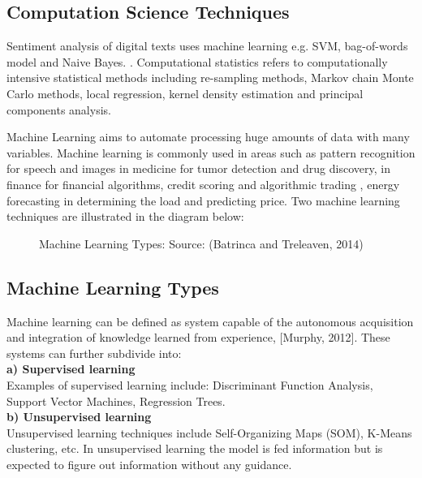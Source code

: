 \subsection{Computation Science Techniques}
Sentiment analysis of digital texts uses machine learning e.g.  SVM, bag-of-words model and Naive Bayes.
\cite{ref26}. Computational statistics refers to computationally intensive statistical methods
including re-sampling methods, Markov chain Monte Carlo methods, local regression, kernel
density estimation and principal components analysis. 

Machine Learning aims to automate processing huge amounts of data with many variables. Machine learning is commonly used in areas such as pattern recognition for speech and  images
in medicine for tumor detection and drug discovery, in finance for financial algorithms, credit scoring and algorithmic trading \cite{ref27}, energy forecasting in determining the load and predicting price.
Two machine learning techniques are illustrated in the diagram below:


\begin{figure}[h]
  \centering
  \caption[Machine learning types]%
  {Machine Learning Types: Source: (Batrinca and Treleaven, 2014)}
  \label{fig:ALAP:sm3}
\end{figure}


\clearpage
\subsection{Machine Learning Types}

Machine learning can be defined as system capable of the autonomous acquisition and integration of knowledge learned from experience, [Murphy, 2012].
These systems can further subdivide into:
\leavevmode\\
\textbf{a) Supervised learning}\\
Examples of supervised learning include: Discriminant Function Analysis, Support Vector Machines, Regression Trees.\\
\textbf{b) Unsupervised learning}\\
Unsupervised learning techniques include Self-Organizing Maps (SOM), K-Means clustering, etc.
In unsupervised learning the model is fed information but is expected to figure out information without any guidance.
\leavevmode\\

